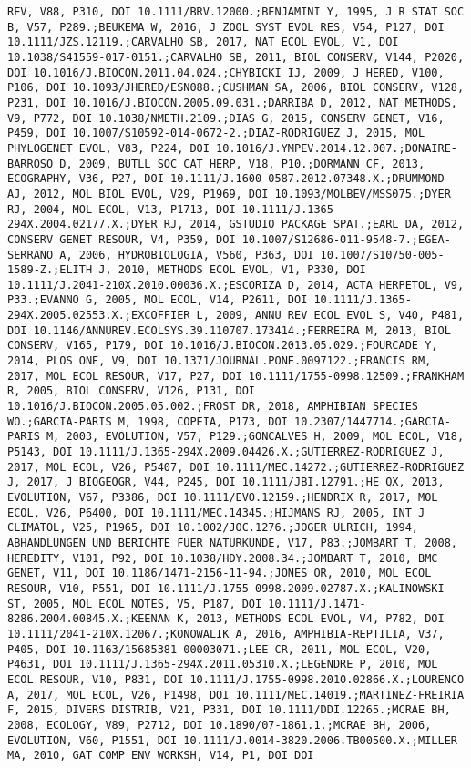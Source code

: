 \documentclass[]{article}
\begin{document}
\begin{verbatim}
REV, V88, P310, DOI 10.1111/BRV.12000.;BENJAMINI Y, 1995, J R STAT SOC B, V57, P289.;BEUKEMA W, 2016, J ZOOL SYST EVOL RES, V54, P127, DOI 10.1111/JZS.12119.;CARVALHO SB, 2017, NAT ECOL EVOL, V1, DOI 10.1038/S41559-017-0151.;CARVALHO SB, 2011, BIOL CONSERV, V144, P2020, DOI 10.1016/J.BIOCON.2011.04.024.;CHYBICKI IJ, 2009, J HERED, V100, P106, DOI 10.1093/JHERED/ESN088.;CUSHMAN SA, 2006, BIOL CONSERV, V128, P231, DOI 10.1016/J.BIOCON.2005.09.031.;DARRIBA D, 2012, NAT METHODS, V9, P772, DOI 10.1038/NMETH.2109.;DIAS G, 2015, CONSERV GENET, V16, P459, DOI 10.1007/S10592-014-0672-2.;DIAZ-RODRIGUEZ J, 2015, MOL PHYLOGENET EVOL, V83, P224, DOI 10.1016/J.YMPEV.2014.12.007.;DONAIRE-BARROSO D, 2009, BUTLL SOC CAT HERP, V18, P10.;DORMANN CF, 2013, ECOGRAPHY, V36, P27, DOI 10.1111/J.1600-0587.2012.07348.X.;DRUMMOND AJ, 2012, MOL BIOL EVOL, V29, P1969, DOI 10.1093/MOLBEV/MSS075.;DYER RJ, 2004, MOL ECOL, V13, P1713, DOI 10.1111/J.1365-294X.2004.02177.X.;DYER RJ, 2014, GSTUDIO PACKAGE SPAT.;EARL DA, 2012, CONSERV GENET RESOUR, V4, P359, DOI 10.1007/S12686-011-9548-7.;EGEA-SERRANO A, 2006, HYDROBIOLOGIA, V560, P363, DOI 10.1007/S10750-005-1589-Z.;ELITH J, 2010, METHODS ECOL EVOL, V1, P330, DOI 10.1111/J.2041-210X.2010.00036.X.;ESCORIZA D, 2014, ACTA HERPETOL, V9, P33.;EVANNO G, 2005, MOL ECOL, V14, P2611, DOI 10.1111/J.1365-294X.2005.02553.X.;EXCOFFIER L, 2009, ANNU REV ECOL EVOL S, V40, P481, DOI 10.1146/ANNUREV.ECOLSYS.39.110707.173414.;FERREIRA M, 2013, BIOL CONSERV, V165, P179, DOI 10.1016/J.BIOCON.2013.05.029.;FOURCADE Y, 2014, PLOS ONE, V9, DOI 10.1371/JOURNAL.PONE.0097122.;FRANCIS RM, 2017, MOL ECOL RESOUR, V17, P27, DOI 10.1111/1755-0998.12509.;FRANKHAM R, 2005, BIOL CONSERV, V126, P131, DOI 10.1016/J.BIOCON.2005.05.002.;FROST DR, 2018, AMPHIBIAN SPECIES WO.;GARCIA-PARIS M, 1998, COPEIA, P173, DOI 10.2307/1447714.;GARCIA-PARIS M, 2003, EVOLUTION, V57, P129.;GONCALVES H, 2009, MOL ECOL, V18, P5143, DOI 10.1111/J.1365-294X.2009.04426.X.;GUTIERREZ-RODRIGUEZ J, 2017, MOL ECOL, V26, P5407, DOI 10.1111/MEC.14272.;GUTIERREZ-RODRIGUEZ J, 2017, J BIOGEOGR, V44, P245, DOI 10.1111/JBI.12791.;HE QX, 2013, EVOLUTION, V67, P3386, DOI 10.1111/EVO.12159.;HENDRIX R, 2017, MOL ECOL, V26, P6400, DOI 10.1111/MEC.14345.;HIJMANS RJ, 2005, INT J CLIMATOL, V25, P1965, DOI 10.1002/JOC.1276.;JOGER ULRICH, 1994, ABHANDLUNGEN UND BERICHTE FUER NATURKUNDE, V17, P83.;JOMBART T, 2008, HEREDITY, V101, P92, DOI 10.1038/HDY.2008.34.;JOMBART T, 2010, BMC GENET, V11, DOI 10.1186/1471-2156-11-94.;JONES OR, 2010, MOL ECOL RESOUR, V10, P551, DOI 10.1111/J.1755-0998.2009.02787.X.;KALINOWSKI ST, 2005, MOL ECOL NOTES, V5, P187, DOI 10.1111/J.1471-8286.2004.00845.X.;KEENAN K, 2013, METHODS ECOL EVOL, V4, P782, DOI 10.1111/2041-210X.12067.;KONOWALIK A, 2016, AMPHIBIA-REPTILIA, V37, P405, DOI 10.1163/15685381-00003071.;LEE CR, 2011, MOL ECOL, V20, P4631, DOI 10.1111/J.1365-294X.2011.05310.X.;LEGENDRE P, 2010, MOL ECOL RESOUR, V10, P831, DOI 10.1111/J.1755-0998.2010.02866.X.;LOURENCO A, 2017, MOL ECOL, V26, P1498, DOI 10.1111/MEC.14019.;MARTINEZ-FREIRIA F, 2015, DIVERS DISTRIB, V21, P331, DOI 10.1111/DDI.12265.;MCRAE BH, 2008, ECOLOGY, V89, P2712, DOI 10.1890/07-1861.1.;MCRAE BH, 2006, EVOLUTION, V60, P1551, DOI 10.1111/J.0014-3820.2006.TB00500.X.;MILLER MA, 2010, GAT COMP ENV WORKSH, V14, P1, DOI DOI 
\end{verbatim}
\end{document}
